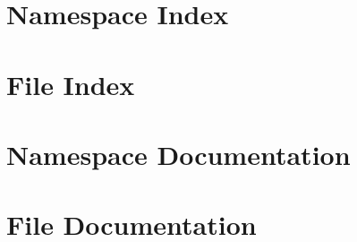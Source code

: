 \documentclass[twoside]{book}
\newcommand{\+}{\discretionary{\mbox{\scriptsize$\hookleftarrow$}}{}{}}
\newcommand{\clearemptydoublepage}{%
  \newpage{\pagestyle{empty}\cleardoublepage}%
}
\begin{document}
\chapter{Namespace Index}

\chapter{File Index}

\chapter{Namespace Documentation}


\chapter{File Documentation}




\backmatter
\newpage
{}
\clearemptydoublepage
{}
\printindex
\end{document}
